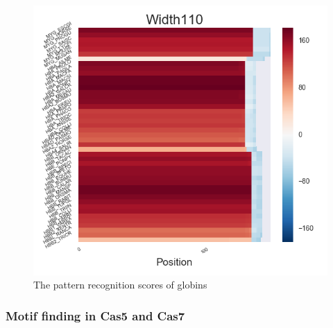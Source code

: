 \documentclass[11pt, oneside]{article}
\begin{document}
\begin{figure}[htbp]
\begin{minipage}{0.32\textwidth}
  \end{minipage}
  \hfill
  \begin{minipage}{0.32\textwidth}
    \centering
    \includegraphics[width=1\textwidth]{images/Width110_heatmap} %
  \end{minipage}
  \caption{The pattern recognition scores of globins}
  \label{fig:recog}
\end{figure}

\subsubsection{Motif finding in Cas5 and Cas7}
\end{document}

